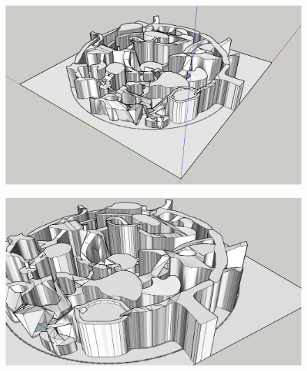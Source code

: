 \begin{figure}[H]
	\centering
	\includegraphics[width=14cm]{images/map/3D_map_011.png}
\end{figure}
\vspace*{3cm}
\begin{figure}[H]
	\centering
	\includegraphics[width=14cm]{images/map/3D_map_012.png}
\end{figure}

